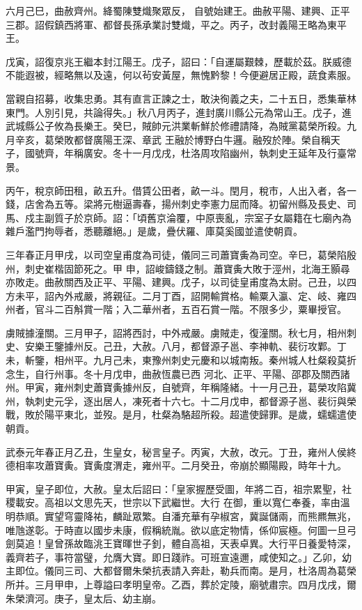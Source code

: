 \begin{pinyinscope}
 六月己巳，曲赦齊州。絳蜀陳雙熾聚眾反，
 自號始建王。曲赦平陽、建興、正平三郡。詔假鎮西將軍、都督長孫承業討雙熾，平之。丙子，改封義陽王略為東平王。



 戊寅，詔復京兆王繼本封江陽王。戊子，詔曰：「自運屬艱棘，歷載於茲。朕威德不能遐被，經略無以及遠，何以茍安黃屋，無愧黔黎！今便避居正殿，蔬食素服。



 當親自招募，收集忠勇。其有直言正諫之士，敢決徇義之夫，二十五日，悉集華林東門。人別引見，共論得失。」秋八月丙子，進封廣川縣公元為常山王。戊子，進武城縣公子攸為長樂王。癸巳，賊帥元洪業斬鮮於修禮請降，為賊黨葛榮所殺。九月辛亥，葛榮敗都督廣陽王深、章武
 王融於博野白牛邏。融歿於陣。榮自稱天子，國號齊，年稱廣安。冬十一月戊戌，杜洛周攻陷幽州，執刺史王延年及行臺常景。



 丙午，稅京師田租，畝五升。借賃公田者，畝一斗。閏月，稅市，人出入者，各一錢，店舍為五等。梁將元樹逼壽春，揚州刺史李憲力屈而降。初留州縣及長史、司馬、戍主副質子於京師。詔：「頃舊京淪覆，中原喪亂，宗室子女屬籍在七廟內為雜戶濫門拘辱者，悉聽離絕。」是歲，疊伏羅、庫莫奚國並遣使朝貢。



 三年春正月甲戌，以司空皇甫度為司徒，儀同三司蕭寶夤為司空。辛巳，葛榮陷殷州，刺史崔楷固節死之。甲
 申，詔峻鑄錢之制。蕭寶夤大敗于涇州，北海王顥尋亦敗走。曲赦關西及正平、平陽、建興。戊子，以司徒皇甫度為太尉。己丑，以四方未平，詔內外戒嚴，將親征。二月丁酉，詔開輸賞格。輸粟入瀛、定、岐、雍四州者，官斗二百斛賞一階；入二華州者，五百石賞一階。不限多少，粟畢授官。



 虜賊據潼關。三月甲子，詔將西討，中外戒嚴。虜賊走，復潼關。秋七月，相州刺史、安樂王鑒據州反。己丑，大赦。八月，都督源子邕、李神軌、裴衍攻鄴。丁未，斬鑒，相州平。九月己未，東豫州刺史元慶和以城南叛。秦州城人杜粲殺莫折念生，自行州事。冬十月戊申，曲赦恆農已西
 河北、正平、平陽、邵郡及關西諸州。甲寅，雍州刺史蕭寶夤據州反，自號齊，年稱隆緒。十一月己丑，葛榮攻陷冀州，執刺史元孚，逐出居人，凍死者十六七。十二月戊申，都督源子邕、裴衍與榮戰，敗於陽平東北，並歿。是月，杜粲為駱超所殺。超遣使歸罪。是歲，蠕蠕遣使朝貢。



 武泰元年春正月乙丑，生皇女，秘言皇子。丙寅，大赦，改元。丁丑，雍州人侯終德相率攻蕭寶夤。寶夤度渭走，雍州平。二月癸丑，帝崩於顯陽殿，時年十九。



 甲寅，皇子即位，大赦。皇太后詔曰：「皇家握歷受圖，年將二百，祖宗累聖，社稷載安。高祖以文思先天，世宗以下武繼世。大行
 在御，重以寬仁奉養，率由溫明恭順。實望穹靈降祐，麟趾眾繁。自潘充華有孕椒宮，冀誕儲兩，而熊羆無兆，唯虺遂彰。于時直以國步未康，假稱統胤。欲以底定物情，係仰宸極。何圖一旦弓劍莫追！皇曾孫故臨洮王寶暉世子釗，體自高祖，天表卓異。大行平日養愛特深，義齊若子，事符當璧，允膺大寶。即日踐祚。可班宣遠邇，咸使知之。」乙卯，幼主即位。儀同三司、大都督爾朱榮抗表請入奔赴，勒兵而南。是月，杜洛周為葛榮所并。三月甲申，上尊謚曰孝明皇帝。乙酉，葬於定陵，廟號肅宗。四月戊戌，爾朱榮濟河。庚子，皇太后、幼主崩。




\end{pinyinscope}

